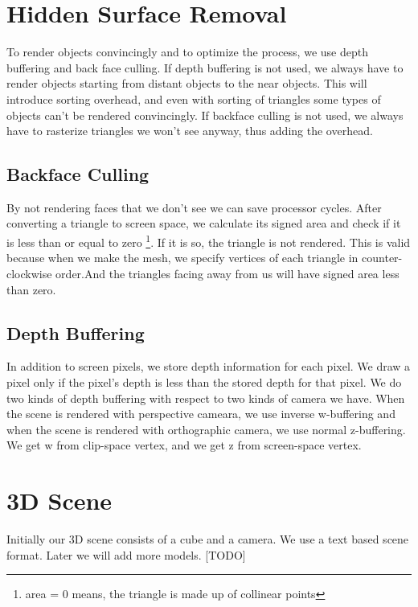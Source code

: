 \section{Hidden Surface Removal}
To render objects convincingly and to optimize the process, we use depth buffering and back face culling. If depth buffering is not used, we always have to render objects starting from distant objects to the near objects. This will introduce sorting overhead, and even with sorting of triangles some types of objects can't be rendered convincingly. If backface culling is not used, we always have to rasterize triangles we won't see anyway, thus adding the overhead.
\subsection{Backface Culling}
By not rendering faces that we don't see we can save processor cycles.
After converting a triangle to screen space, we calculate its signed area and check if it is less than or equal to zero \footnote{area = 0 means, the triangle is made up of collinear points}. If it is so, the triangle is not rendered. This is valid because when we make the mesh, we specify vertices of each triangle in counter-clockwise order.And the triangles facing away from us will have signed area less than zero.
\subsection{Depth Buffering}
In addition to screen pixels, we store depth information for each pixel.
We draw a pixel only if the pixel's depth is less than the stored depth for that pixel. We do two kinds of depth buffering with respect to two kinds of camera we have. When the scene is rendered with perspective cameara, we use inverse w-buffering and when the scene is rendered with orthographic camera, we use normal z-buffering.
We get w from clip-space vertex, and we get z from screen-space vertex. 

\section{3D Scene}
Initially our 3D scene consists of a cube and a camera. We use a text based scene format. Later we will add more models.  [TODO]
